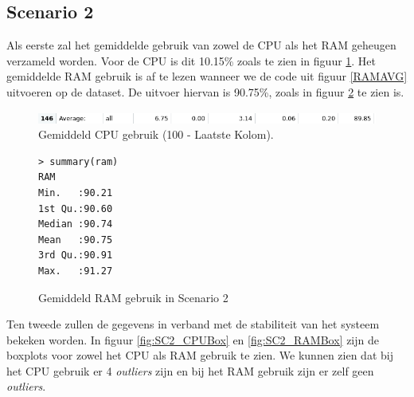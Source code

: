 
\clearpage
\subsection{Scenario 2}
Als eerste zal het gemiddelde gebruik van zowel de CPU als het RAM geheugen verzameld worden. Voor de CPU is dit 10.15\% zoals te zien in figuur \ref{fig:SC2_CPUAVG}. Het gemiddelde RAM gebruik is af te lezen wanneer we de code uit figuur \ref{RAMAVG} uitvoeren op de dataset. De uitvoer hiervan is 90.75\%, zoals in figuur \ref{SC2_RAMAVG} te zien is.
\begin{figure}[h]
	\centering
	\includegraphics[width=\linewidth]{img/SC2_CPUAVG.png}
	\caption{Gemiddeld CPU gebruik (100 - Laatste Kolom).}
	\label{fig:SC2_CPUAVG}
\end{figure}
\begin{figure}[h]
	\centering
	\begin{verbatim} 
> summary(ram)
RAM       
Min.   :90.21  
1st Qu.:90.60  
Median :90.74  
Mean   :90.75  
3rd Qu.:90.91  
Max.   :91.27  
	\end{verbatim}
	\caption{Gemiddeld RAM gebruik in Scenario 2}
	\label{SC2_RAMAVG}
\end{figure}

Ten tweede zullen de gegevens in verband met de stabiliteit van het systeem bekeken worden. In figuur \ref{fig:SC2_CPUBox} en \ref{fig:SC2_RAMBox} zijn de boxplots voor zowel het CPU als RAM gebruik te zien. We kunnen zien dat bij het CPU gebruik er 4 \textit{outliers} zijn en bij het RAM gebruik zijn er zelf geen \textit{outliers}. 

